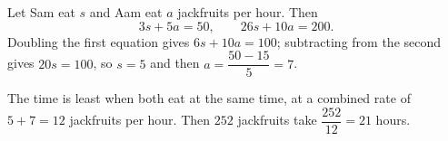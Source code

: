 Let Sam eat $s$ and Aam eat $a$ jackfruits per hour. Then
\[3s+5a=50,\qquad 26s+10a=200 .\]
Doubling the first equation gives $6s+10a=100$; subtracting from the second gives $20s=100$, so $s=5$ and then $a=\dfrac{50-15}{5}=7$.

The time is least when both eat at the same time, at a combined rate of $5+7=12$ jackfruits per hour. Then $252$ jackfruits take $\dfrac{252}{12}=\boxed{21}$ hours.
